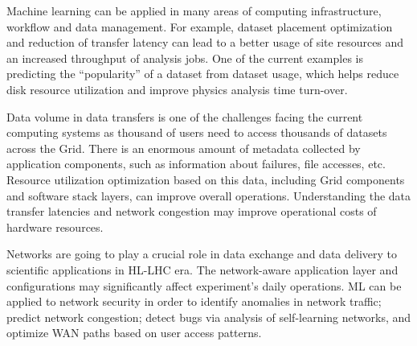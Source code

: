 Machine learning can be applied in many areas of computing infrastructure, workflow and data management. For example, dataset placement optimization and reduction of transfer latency can lead to a better usage of site resources and an increased throughput of analysis jobs. One of the current examples is predicting the ``popularity'' of a dataset from dataset usage, which helps reduce disk resource utilization and improve physics analysis time turn-over.

Data volume in data transfers is one of the challenges facing the current computing systems as thousand of users need to access thousands of datasets across the Grid. There is an enormous amount of metadata collected by application components, such as information about failures, file accesses, etc. Resource utilization optimization based on this data, including Grid components and software stack layers, can improve overall operations. Understanding the data transfer latencies and network congestion may improve operational costs of hardware resources.

Networks are going to play a crucial role in data exchange and data delivery to scientific applications in HL-LHC era. The network-aware application layer and configurations may significantly affect experiment's daily operations. ML can be applied to network security in order to identify anomalies in network traffic; predict network congestion; detect bugs via analysis of self-learning networks, and optimize WAN paths based on user access patterns.




